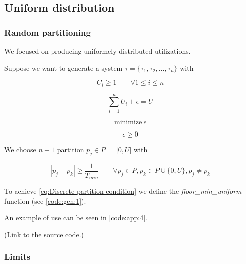 \subsection{Uniform distribution}

\subsubsection{Random partitioning}

We focused on producing uniformely distributed utilizations.

Suppose we want to generate a system $\tau = \{\tau_1 , \tau_2 , \dots , \tau_n \}$ with

\begin{equation}
	C_i \geq 1 \qquad \forall 1 \leq i \leq n
	\label{eq:WCET minimum}
\end{equation}

\begin{equation}
	\sum_{i=1}^{n} U_i + \epsilon = U
	\label{eq:Usage shift}
\end{equation}

\begin{equation}
	\text{minimize}~\epsilon
	\label{eq:Economic function of the generator}
\end{equation}

\begin{equation}
	\epsilon \geq 0
	\label{eq:Usage shift polarity}
\end{equation}

We choose $n-1$ partition $p_j \in P = ~]0, U[$ with

\begin{equation}
	|p_j - p_k| \geq \frac{1}{T_{min}} \qquad \forall p_j \in P, p_k \in P \cup \{0, U\}, p_j \neq p_k
	\label{eq:Discrete partition condition}
\end{equation}

To achieve \ref{eq:Discrete partition condition} we define the \emph{floor\_min\_uniform} function (see \ref{code:gen:1}).


An example of use can be seen in \ref{code:app:4}.

(\href{../h/os/generator.h}{Link to the source code}.)

\subsubsection{Limits}

